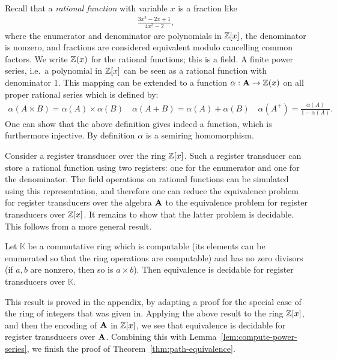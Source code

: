Recall that a \emph{rational function} with variable $x$ is a fraction like
\begin{align*}
\frac{3x^2 -2x +1}{4x^3 -2},
\end{align*}
where  the enumerator and denominator are polynomials in $\mathbb Z[x]$, the denominator is nonzero, and fractions are considered equivalent modulo cancelling common factors. We write $\mathbb Z(x)$ for the rational functions; this is a field.  A finite power series, i.e.~a polynomial in $\mathbb Z[x]$ can be seen as a rational function with denominator 1. This mapping can be extended to a function $\alpha : \mathbf{A} \to \mathbb Z(x)$ on all proper rational series 
which is defined by:
\begin{align*}
\alpha(A \times B) = \alpha(A) \times \alpha(B) \quad \alpha(A + B) = \alpha(A) + \alpha(B) \quad \alpha(A^+) = \frac{\alpha(A)}{1-\alpha(A)}.
\end{align*}
One can show that the above definition gives indeed a function, which is furthermore injective. By definition $\alpha$ is a semiring homomorphism. 

Consider a register transducer over the ring $\mathbb Z[x]$. Such a register transducer can store a rational function using two registers: one for the enumerator and one for the denominator. The field operations on rational functions can be simulated using this representation, and therefore one can reduce the equivalence problem for register transducers over the algebra $\mathbf{A}$ to the equivalence problem for register transducers over $\mathbb Z[x]$. It remains to show that the latter problem is decidable. This follows from a more general result.

\begin{theorem}\label{thm:equivalence-for-computable-field}
    Let $\mathbb K$ be a commutative ring which is computable (its elements can be enumerated so that the ring operations are computable) and has no zero divisors (if $a,b$ are nonzero, then so is $a \times b$). Then equivalence is decidable for register transducers over $\mathbb K$.
\end{theorem}
This result is proved in the appendix, by adapting a proof for the special case of the ring of integers that was given in\cite[Theorem 6.6]{seidlManethKemper2018}. 
Applying the above result to the ring $\mathbb Z[x]$, and then the encoding of $\mathbf{A}$ in $\mathbb Z[x]$, we see that equivalence is decidable for register transducers over $\mathbf{A}$. Combining this with Lemma~\ref{lem:compute-power-series}, we finish the proof of Theorem~\ref{thm:path-equivalence}.



